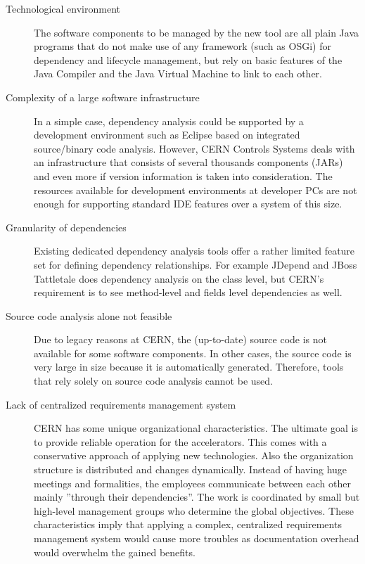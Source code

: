 \begin{description}
\item[Technological environment] The software components to be managed by the
new tool are all plain Java programs that do not make use of any framework (such
as OSGi) for dependency and lifecycle management, but rely on basic
features of the Java Compiler and the Java Virtual Machine to link to each
other.
 
\item[Complexity of a large software infrastructure] In a simple case,
dependency analysis could be supported by a development environment such as
Eclipse based on integrated source/binary code analysis. However, CERN Controls
Systems deals with an infrastructure that consists of several thousands
components (JARs) and even more if version information is taken into
consideration. The resources available for development environments at developer
PCs are not enough for supporting standard IDE features over a system of this
size.
 
\item[Granularity of dependencies] Existing dedicated dependency analysis tools
offer a rat\-her limited feature set for defining dependency relationships.
For example JDepend \cite{JDepend} and JBoss Tattletale \cite{Tattletale} does
dependency analysis on the class level, but CERN's requirement is to see
method-level and fields level dependencies as well.

\item[Source code analysis alone not feasible] Due to legacy reasons at CERN,
the (up-to-date) source code is not available for some software components. In
other cases, the source code is very large in size because it is automatically
generated. Therefore, tools that rely solely on source code analysis cannot be
used.

\item[Lack of centralized requirements management system] CERN has some unique
organizational characteristics. The ultimate goal is to provide reliable
operation for the accelerators. This comes with a conservative approach of
applying new technologies. Also the organization structure is distributed and
changes dynamically. Instead of having huge meetings and formalities, the
employees communicate between each other mainly ''through their dependencies''.
The work is coordinated by small but high-level management groups who determine
the global objectives. These characteristics imply that applying a complex,
centralized requirements management system would cause more troubles as
documentation overhead would overwhelm the gained benefits.

\end{description}

